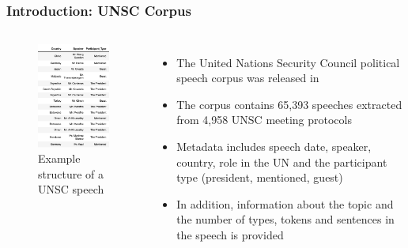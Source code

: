 \documentclass{beamer}
\begin{document}
	\subsection{}
	\begin{framefont}{\footnotesize}
		\begin{frame}
			\frametitle{Introduction: UNSC Corpus}
			\vspace{-10pt}
			\begin{columns}
				\centering
				\begin{figure}
					\captionsetup{justification=centering}
					\includegraphics[trim={0.7cm 0cm 0.2cm 0.2cm},clip,width=4.4cm]{overview_dataset.png}
					\caption{Example structure of a UNSC speech}
				\end{figure}
				\begin{itemize}
					\setlength\itemsep{1.5em}
					\item The United Nations Security Council political speech corpus was released in \citet{schnfeld2019security}
					\item The corpus contains 65,393 speeches extracted from 4,958 UNSC meeting protocols 
					\item Metadata includes speech date, speaker, country, role in the UN and the participant type (president, mentioned, guest)
					\item In addition, information about the topic and the number of types, tokens and sentences in the speech is provided
				\end{itemize}
			\end{columns}
		\end{frame}
	\end{framefont}
\end{document}
